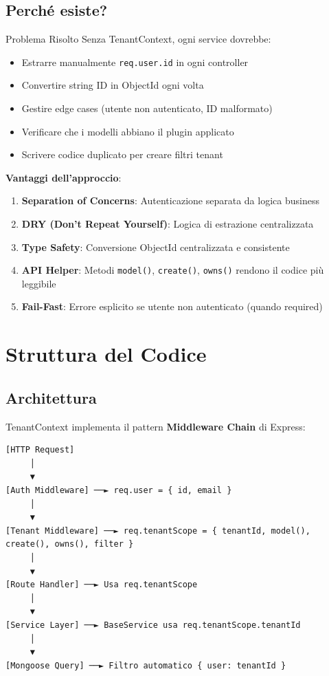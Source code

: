 \documentclass[11pt,a4paper]{article}
\begin{document}
\subsection{Perché esiste?}

\begin{importantbox}{Problema Risolto}
Senza TenantContext, ogni service dovrebbe:
\begin{itemize}
    \item Estrarre manualmente \texttt{req.user.id} in ogni controller
    \item Convertire string ID in ObjectId ogni volta
    \item Gestire edge cases (utente non autenticato, ID malformato)
    \item Verificare che i modelli abbiano il plugin applicato
    \item Scrivere codice duplicato per creare filtri tenant
\end{itemize}
\end{importantbox}

\textbf{Vantaggi dell'approccio}:
\begin{enumerate}
    \item \textbf{Separation of Concerns}: Autenticazione separata da logica business
    \item \textbf{DRY (Don't Repeat Yourself)}: Logica di estrazione centralizzata
    \item \textbf{Type Safety}: Conversione ObjectId centralizzata e consistente
    \item \textbf{API Helper}: Metodi \texttt{model()}, \texttt{create()}, \texttt{owns()} rendono il codice più leggibile
    \item \textbf{Fail-Fast}: Errore esplicito se utente non autenticato (quando required)
\end{enumerate}

\section{Struttura del Codice}

\subsection{Architettura}

TenantContext implementa il pattern \textbf{Middleware Chain} di Express:

\begin{lstlisting}
[HTTP Request]
     │
     ▼
[Auth Middleware] ──► req.user = { id, email }
     │
     ▼
[Tenant Middleware] ──► req.tenantScope = { tenantId, model(), create(), owns(), filter }
     │
     ▼
[Route Handler] ──► Usa req.tenantScope
     │
     ▼
[Service Layer] ──► BaseService usa req.tenantScope.tenantId
     │
     ▼
[Mongoose Query] ──► Filtro automatico { user: tenantId }
\end{lstlisting}
\end{document}
